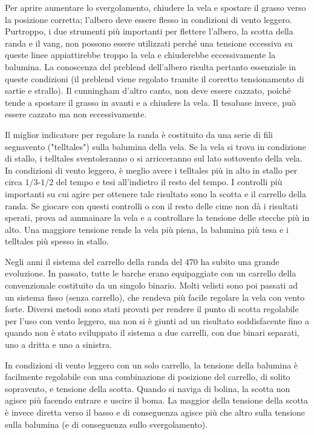 Per aprire aumentare lo svergolamento, chiudere la vela e spostare il grasso
verso la posizione corretta; l'albero deve essere flesso in condizioni di vento
leggero. Purtroppo, i due strumenti più importanti per flettere l'albero, la
scotta della randa e il vang, non possono essere utilizzati perché una tensione
eccessiva su queste linee appiattirebbe troppo la vela e chiuderebbe
eccessivamente la balumina. La conoscenza del preblend dell'albero risulta
pertanto essenziale in queste condizioni (il preblend viene regolato tramite il
corretto tensionamento di sartie e strallo). Il cunningham d'altro canto, non
deve essere cazzato, poiché tende a spostare il grasso in avanti e a chiudere la
vela. Il tesabase invece, può essere cazzato ma non eccessivamente.

Il miglior indicatore per regolare la randa è costituito da una serie di fili
segnavento ("telltales") sulla
balumina della vela. Se la vela si trova in condizione di stallo, i
telltales sventoleranno o si arricceranno sul lato sottovento della vela. In condizioni di vento leggero, è meglio avere
i telltales più in alto in stallo per circa $1/3$-$1/2$ del tempo e tesi all'indietro
il resto del tempo. I controlli più importanti su cui agire per ottenere tale
risultato sono la scotta e il carrello della randa. Se giocare con questi
controlli o con il resto delle cime non dà i risultati sperati, prova ad ammainare
la vela e a controllare la tensione delle stecche più in alto. Una maggiore tensione
rende la vela più piena, la balumina più tesa e i telltales più spesso in
stallo.

Negli anni il sistema del carrello della randa del 470 ha subito una grande
evoluzione. In passato, tutte le barche erano equipaggiate con un carrello della
convenzionale costituito da un singolo binario. Molti velisti sono poi passati ad un sistema
fisso (senza carrello), che rendeva più facile regolare la vela con vento forte.
Diversi metodi sono stati provati per rendere il punto di scotta regolabile per l'uso con vento
leggero, ma non si è giunti ad un risultato soddisfacente fino a quando non è
stato sviluppato il sistema a due carrelli, con due binari separati, uno a
dritta e uno a sinistra.

In condizioni di vento leggero con un solo carrello, la tensione della balumina
è facilmente regolabile con una combinazione di posizione del carrello, di
solito sopravento, e tensione della scotta. Quando si naviga
di bolina, la scotta non agisce più facendo entrare e uscire il boma. La
maggior della tensione della scotta è invece diretta verso il basso e di
conseguenza agisce più che altro sulla tensione sulla balumina (e di conseguenza
sullo svergolamento).

